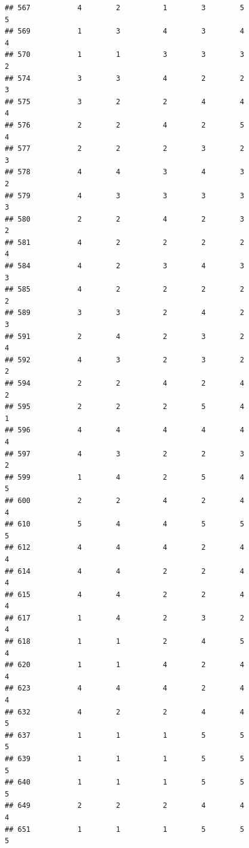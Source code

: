 \documentclass[
]{article}
\begin{document}
\begin{verbatim}
## 567           4        2          1        3        5               5
## 569           1        3          4        3        4               4
## 570           1        1          3        3        3               2
## 574           3        3          4        2        2               3
## 575           3        2          2        4        4               4
## 576           2        2          4        2        5               4
## 577           2        2          2        3        2               3
## 578           4        4          3        4        3               2
## 579           4        3          3        3        3               3
## 580           2        2          4        2        3               2
## 581           4        2          2        2        2               4
## 584           4        2          3        4        3               3
## 585           4        2          2        2        2               2
## 589           3        3          2        4        2               3
## 591           2        4          2        3        2               4
## 592           4        3          2        3        2               2
## 594           2        2          4        2        4               2
## 595           2        2          2        5        4               1
## 596           4        4          4        4        4               4
## 597           4        3          2        2        3               2
## 599           1        4          2        5        4               5
## 600           2        2          4        2        4               4
## 610           5        4          4        5        5               5
## 612           4        4          4        2        4               4
## 614           4        4          2        2        4               4
## 615           4        4          2        2        4               4
## 617           1        4          2        3        2               4
## 618           1        1          2        4        5               4
## 620           1        1          4        2        4               4
## 623           4        4          4        2        4               4
## 632           4        2          2        4        4               5
## 637           1        1          1        5        5               5
## 639           1        1          1        5        5               5
## 640           1        1          1        5        5               5
## 649           2        2          2        4        4               4
## 651           1        1          1        5        5               5

\end{verbatim}
\end{document}
